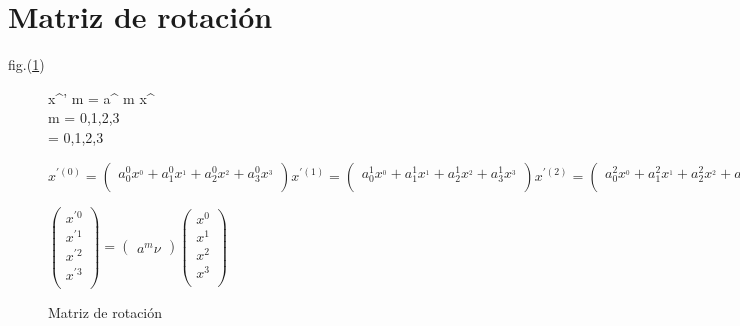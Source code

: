 \section*{Matriz de rotaci\'on}

 fig.(\ref{permutaciones_tree})\\
\begin{figure}[h]
	\begin{center}
	
	 x^{' m} = a^{ m}  {\nu} x^{\nu}\\
	 m = 0,1,2,3\\
	 \nu = 0,1,2,3\\
  \vspace{5mm} %
	
        \(
  x^{'(0)} =
  \left( {\begin{array}{cc}
    a^{0} _0 x^{_0} + a^{0} _1 x^{_1} + a^{0} _2 x^{_2} + a^{0} _3 x^{_3}\\
  \end{array} } \right)
  
    x^{'(1)} =
  \left( {\begin{array}{cc}
    a^{1} _0 x^{_0} + a^{1} _1 x^{_1} + a^{1} _2 x^{_2} + a^{1} _3 x^{_3}\\
  \end{array} } \right)
  
      x^{'(2)} =
  \left( {\begin{array}{cc}
    a^{2} _0 x^{_0} + a^{2} _1 x^{_1} + a^{2} _2 x^{_2} + a^{2} _3 x^{_3}\\
  \end{array} } \right)
  
      x^{'(3)} =
  \left( {\begin{array}{cc}
    a^{3} _0 x^{_0} + a^{3} _1 x^{_1} + a^{3} _2 x^{_2} + a^{3} _3 x^{_3}\\
  \end{array} } \right)
  \)
  
  \vspace{5mm} %
  
  
\(
  
    \left(
      \begin{array}{ccc}
        x^{'0}\\
        x^{'1}\\
        x^{'2}\\
        x^{'3}\\ 
      \end{array}
    \right)
    =
    \left(
        \begin{array}{c}
             a^{m}\nu
        \end{array}
    \right)
    {}
    \left(
        \begin{array}{ccc}
        x^{0}\\
        x^{1}\\
        x^{2}\\
        x^{3}\\ 
        \end{array}
    \right)
\)

  
    
	\end{center}
	\caption{Matriz de rotaci\'on}
	\label{permutaciones_tree}
\end{figure}

